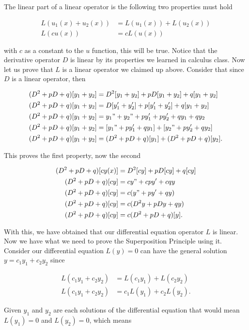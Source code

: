 \documentclass[12pt]{article}
\begin{document}
The linear part of a linear operator is the following two properties must hold

\begin{align*}
    L(u_1(x)+u_2(x)) &= L(u_1(x)) + L(u_2(x)) \\
    L(cu(x)) &= cL(u(x))
\end{align*}

with $c$ as a constant to the $u$ function, this will be true. Notice that the derivative operator $D$ is linear by its properties we learned in calculus class. Now let us prove that $L$ is a linear operator we claimed up above. Consider that since $D$ is a linear operator, then

\begin{align*}
    (D^2+pD+q)[y_1+y_2] &= D^2[y_1+y_2]+pD[y_1+y_2]+q[y_1+y_2] \\
    (D^2+pD+q)[y_1+y_2] &= D[y'_1+y'_2]+p[y'_1+y'_2]+q[y_1+y_2] \\
    (D^2+pD+q)[y_1+y_2] &= y_1"+y_2"+py'_1+py'_2+qy_1+qy_2 \\
    (D^2+pD+q)[y_1+y_2] &= [y_1"+py'_1+qy_1]+[y_2"+py'_2+qy_2] \\
    (D^2+pD+q)[y_1+y_2] &= (D^2+pD+q)[y_1] +(D^2+pD+q)[y_2].
\end{align*}

This proves the first property, now the second

\begin{align*}
    (D^2+pD+q)[cy(x)] &= D^2[cy]+pD[cy]+q[cy] \\
    (D^2+pD+q)[cy] &= cy" + cpy' + cqy \\
    (D^2+pD+q)[cy] &= c(y" + py' + qy) \\    
    (D^2+pD+q)[cy] &= c(D^2y + pDy + qy) \\
    (D^2+pD+q)[cy] &= c(D^2 + pD + q)[y].
\end{align*}

With this, we have obtained that our differential equation operator $L$ is linear. Now we have what we need to prove the Superposition Principle using it. Consider our differential equation $L(y)=0$ can have the general solution $y=c_1y_1+c_2y_2$ since

\begin{align*}
    L(c_1y_1+c_2y_2) &= L(c_1y_1) + L(c_2y_2) \\
    L(c_1y_1+c_2y_2) &= c_1L(y_1) + c_2L(y_2).
\end{align*}

Given $y_1$ and $y_2$ are each solutions of the differential equation that would mean $L(y_1)=0$ and $L(y_2)=0$, which means
\end{document}
